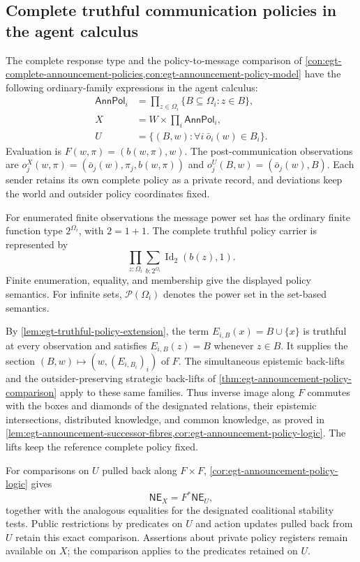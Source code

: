 \documentclass[11pt,a4paper]{article}
\numberwithin{equation}{section}
\theoremstyle{definition}
\theoremstyle{remark}
\theoremstyle{plain}
\providecommand{\AnnPol}{\mathsf{AnnPol}}
\providecommand{\NE}{\mathsf{NE}}
\begin{document}
\subsection{Complete truthful communication policies in the agent calculus}
\label{sec:agt-announcement-internal-language}

The complete response type and the policy-to-message comparison of
\cref{con:egt-complete-announcement-policies,con:egt-announcement-policy-model}
have the following ordinary-family expressions in the agent calculus:
\[
 \begin{aligned}
 \AnnPol_i &=\prod_{z\in\Omega_i}\{B\subseteq\Omega_i:z\in B\},\\
 X &=W\times\prod_i\AnnPol_i,\\
 U &=\{(B,w):\forall i\ \bar o_i(w)\in B_i\}.
 \end{aligned}
\]
Evaluation is $F(w,\pi)=(b(w,\pi),w)$. The post-communication observations
are $o_j^X(w,\pi)=(\bar o_j(w),\pi_j,b(w,\pi))$ and
$o_j^U(B,w)=(\bar o_j(w),B)$. Each sender retains its own complete
policy as a private record, and deviations keep the world and outsider
policy coordinates fixed.

For enumerated finite observations the message power set has the ordinary
finite function type $2^{\Omega_i}$, with $2=1+1$. The complete truthful
policy carrier is represented by
\[
 \prod_{z:\Omega_i}\sum_{b:2^{\Omega_i}}
       \operatorname{Id}_2(b(z),1).
\]
Finite enumeration, equality, and membership give the displayed policy
semantics. For infinite sets, $\mathcal P(\Omega_i)$ denotes the power set
in the set-based semantics.

By \cref{lem:egt-truthful-policy-extension}, the term
$E_{i,B}(x)=B\cup\{x\}$ is truthful at every observation and satisfies
$E_{i,B}(z)=B$ whenever $z\in B$. It supplies the section
$(B,w)\mapsto(w,(E_{i,B_i})_i)$ of $F$.
The simultaneous epistemic back-lifts and the outsider-preserving strategic
back-lifts of \cref{thm:egt-announcement-policy-comparison} apply to these
same families. Thus inverse image along $F$ commutes with the boxes and
diamonds of the designated relations, their epistemic intersections,
distributed knowledge, and common knowledge, as proved in
\cref{lem:egt-announcement-successor-fibres,cor:egt-announcement-policy-logic}.
The lifts keep the reference complete policy fixed.

For comparisons on $U$ pulled back along $F\times F$,
\cref{cor:egt-announcement-policy-logic} gives
\[
 \NE_X=F^*\NE_U,
\]
together with the analogous equalities for the designated coalitional
stability tests. Public restrictions by predicates on $U$ and action
updates pulled back from $U$ retain this exact comparison. Assertions about
private policy registers remain available on $X$; the comparison applies
to the predicates retained on $U$.
\end{document}
